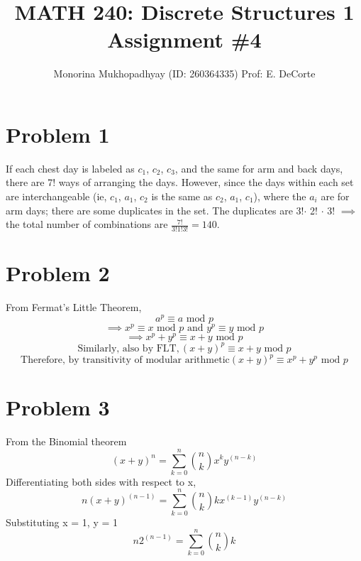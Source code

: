 \documentclass[english]{article}
\title{MATH 240: Discrete Structures 1 Assignment \#4}
\author{Monorina Mukhopadhyay (ID: 260364335) Prof: E. DeCorte}
\begin{document}
\maketitle
\section*{Problem 1}
If each chest day is labeled as {$c_1$, $c_2$, $c_3$}, and the same for arm and back days, there are 7! ways of arranging the days. However, since the days within each set are interchangeable (ie, $c_1$, $a_1$, $c_2$ is the same as $c_2$, $a_1$, $c_1$), where the $a_i$ are for arm days; there are some duplicates in the set. The duplicates are 3!$\cdot$ 2! $\cdot$ 3! $\implies$ the total number of combinations are $\frac{7!}{3! 1! 3!} = 140$.
\section*{Problem 2}
 From Fermat's Little Theorem,
 $$ a^p \equiv a \text{ mod } p$$
 $$ \implies x^p \equiv x \text{ mod } p \text{ and } y^p \equiv y \text{ mod } p$$
 $$\implies x^p + y^p \equiv x + y \text{ mod } p$$
 $$ \text{Similarly, also by FLT}, (x + y)^p \equiv x + y \text{ mod } p$$
 $$ \text{Therefore, by transitivity of modular arithmetic} (x + y)^p \equiv x^p + y^p \text{ mod } p$$
\section*{Problem 3}
From the Binomial theorem
$$ (x + y)^n = \sum_{k=0}^n \binom{n}{k} x^k y^{(n-k)}$$
Differentiating both sides with respect to x,
$$ n(x+y)^{(n-1)} = \sum_{k=0}^n \binom{n}{k} k x^{(k-1)} y^{(n-k)}$$
Substituting x = 1, y = 1
$$ n 2^{(n-1)} = \sum_{k=0}^n \binom{n}{k} k $$
\end{document}
